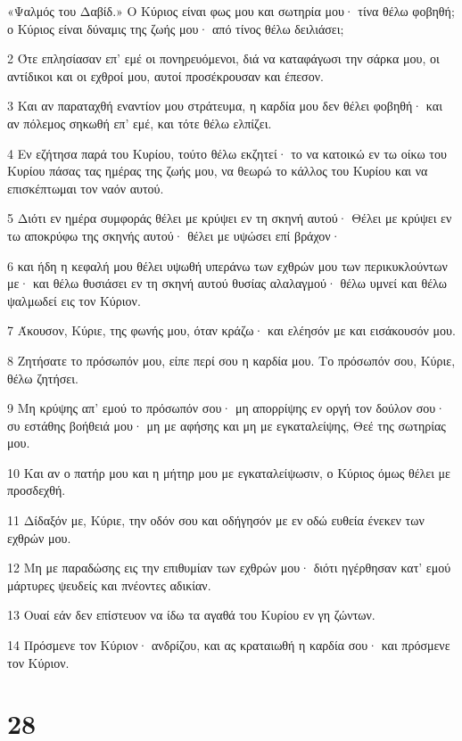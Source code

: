 \par «Ψαλμός του Δαβίδ.» Ο Κύριος είναι φως μου και σωτηρία μου· τίνα θέλω φοβηθή; ο Κύριος είναι δύναμις της ζωής μου· από τίνος θέλω δειλιάσει;
\par 2 Ότε επλησίασαν επ' εμέ οι πονηρευόμενοι, διά να καταφάγωσι την σάρκα μου, οι αντίδικοι και οι εχθροί μου, αυτοί προσέκρουσαν και έπεσον.
\par 3 Και αν παραταχθή εναντίον μου στράτευμα, η καρδία μου δεν θέλει φοβηθή· και αν πόλεμος σηκωθή επ' εμέ, και τότε θέλω ελπίζει.
\par 4 Εν εζήτησα παρά του Κυρίου, τούτο θέλω εκζητεί· το να κατοικώ εν τω οίκω του Κυρίου πάσας τας ημέρας της ζωής μου, να θεωρώ το κάλλος του Κυρίου και να επισκέπτωμαι τον ναόν αυτού.
\par 5 Διότι εν ημέρα συμφοράς θέλει με κρύψει εν τη σκηνή αυτού· Θέλει με κρύψει εν τω αποκρύφω της σκηνής αυτού· θέλει με υψώσει επί βράχον·
\par 6 και ήδη η κεφαλή μου θέλει υψωθή υπεράνω των εχθρών μου των περικυκλούντων με· και θέλω θυσιάσει εν τη σκηνή αυτού θυσίας αλαλαγμού· θέλω υμνεί και θέλω ψαλμωδεί εις τον Κύριον.
\par 7 Άκουσον, Κύριε, της φωνής μου, όταν κράζω· και ελέησόν με και εισάκουσόν μου.
\par 8 Ζητήσατε το πρόσωπόν μου, είπε περί σου η καρδία μου. Το πρόσωπόν σου, Κύριε, θέλω ζητήσει.
\par 9 Μη κρύψης απ' εμού το πρόσωπόν σου· μη απορρίψης εν οργή τον δούλον σου· συ εστάθης βοήθειά μου· μη με αφήσης και μη με εγκαταλείψης, Θεέ της σωτηρίας μου.
\par 10 Και αν ο πατήρ μου και η μήτηρ μου με εγκαταλείψωσιν, ο Κύριος όμως θέλει με προσδεχθή.
\par 11 Δίδαξόν με, Κύριε, την οδόν σου και οδήγησόν με εν οδώ ευθεία ένεκεν των εχθρών μου.
\par 12 Μη με παραδώσης εις την επιθυμίαν των εχθρών μου· διότι ηγέρθησαν κατ' εμού μάρτυρες ψευδείς και πνέοντες αδικίαν.
\par 13 Ουαί εάν δεν επίστευον να ίδω τα αγαθά του Κυρίου εν γη ζώντων.
\par 14 Πρόσμενε τον Κύριον· ανδρίζου, και ας κραταιωθή η καρδία σου· και πρόσμενε τον Κύριον.

\chapter{28}

